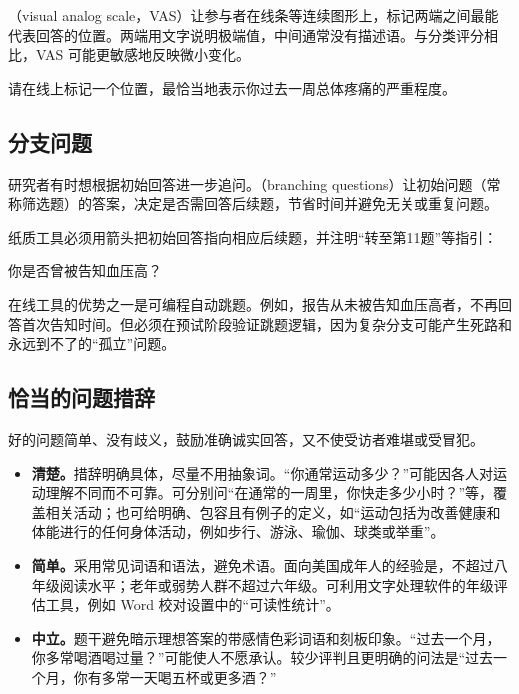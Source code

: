 （visual analog scale，VAS）让参与者在线条等连续图形上，标记两端之间最能代表回答的位置。两端用文字说明极端值，中间通常没有描述语。与分类评分相比，VAS 可能更敏感地反映微小变化。
\begin{bookbox}{请在线上标记一个位置，最恰当地表示你过去一周总体疼痛的严重程度。}
\centering
{}
\end{bookbox}

\subsection{分支问题}
研究者有时想根据初始回答进一步追问。（branching questions）让初始问题（常称筛选题）的答案，决定是否需回答后续题，节省时间并避免无关或重复问题。

纸质工具必须用箭头把初始回答指向相应后续题，并注明“转至第11题”等指引：
\begin{bookbox}{你是否曾被告知血压高？}
\end{bookbox}
在线工具的优势之一是可编程自动跳题。例如，报告从未被告知血压高者，不再回答首次告知时间。但必须在预试阶段验证跳题逻辑，因为复杂分支可能产生死路和永远到不了的“孤立”问题。
\subsection{恰当的问题措辞}
好的问题简单、没有歧义，鼓励准确诚实回答，又不使受访者难堪或受冒犯。
\begin{itemize}
\item \textbf{清楚。}措辞明确具体，尽量不用抽象词。“你通常运动多少？”可能因各人对运动理解不同而不可靠。可分别问“在通常的一周里，你快走多少小时？”等，覆盖相关活动；也可给明确、包容且有例子的定义，如“运动包括为改善健康和体能进行的任何身体活动，例如步行、游泳、瑜伽、球类或举重”。
\item \textbf{简单。}采用常见词语和语法，避免术语。面向美国成年人的经验是，不超过八年级阅读水平；老年或弱势人群不超过六年级。可利用文字处理软件的年级评估工具，例如 Word 校对设置中的“可读性统计”。
\item \textbf{中立。}题干避免暗示理想答案的带感情色彩词语和刻板印象。“过去一个月，你多常喝酒喝过量？”可能使人不愿承认。较少评判且更明确的问法是“过去一个月，你有多常一天喝五杯或更多酒？”
\end{itemize}

